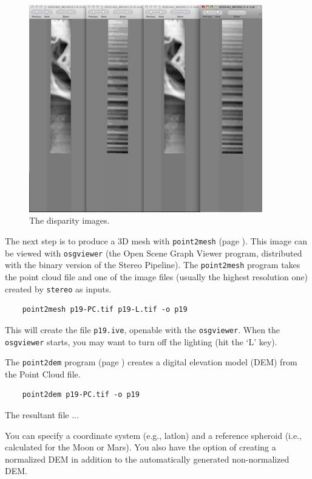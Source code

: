 \begin{figure}
\begin{center}
\includegraphics[width=4in]{images/p19-disparity.png}
\caption[P19 disparity images]{
    \label{p19-disparity}
	The disparity images.
    }
\end{center}
\end{figure}

The next step is to produce a 3D mesh with \texttt{point2mesh} (page
\pageref{point2mesh}).  This image can be viewed with \texttt{osgviewer}
(the Open Scene Graph Viewer program, distributed with the binary version
of the Stereo Pipeline).  The \texttt{point2mesh} program takes the
point cloud file and one of the image files (usually the highest
resolution one) created by \texttt{stereo} as inputs.

\begin{verbatim}
    point2mesh p19-PC.tif p19-L.tif -o p19
\end{verbatim}

This will create the file \texttt{p19.ive}, openable with the
\texttt{osgviewer}. When the \texttt{osgviewer} starts, you may
want to turn off the lighting (hit the `L' key).

The \texttt{point2dem} program (page \pageref{point2dem}) creates
a digital elevation model (DEM) from the Point Cloud file.

\begin{verbatim}
    point2dem p19-PC.tif -o p19
\end{verbatim}

The resultant file ...

You can specify a coordinate system (e.g., latlon) and a reference
spheroid (i.e., calculated for the Moon or Mars). You also have the
option of creating a normalized DEM in addition to the automatically
generated non-normalized DEM.


